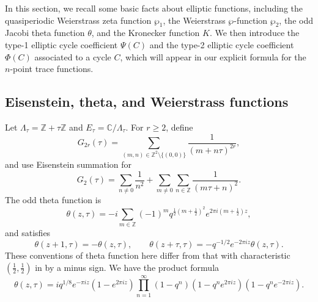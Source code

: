 \documentclass[11pt,a4paper]{amsart}
\numberwithin{equation}{section}
\theoremstyle{definition}
\theoremstyle{remark}
\newcommand{\CC}{\mathbb C}
\newcommand{\ZZ}{\mathbb Z}
\newcommand{\ii}{i}
\newcommand{\e}{e}
\begin{document}
In this section, we recall some basic facts about elliptic functions, including the quasiperiodic Weierstrass zeta function $\wp_1$, the Weierstrass $\wp$-function $\wp_2$, the odd Jacobi theta function $\theta$, and the Kronecker function $K$. We then introduce the type-1 elliptic cycle coefficient $\Psi(C)$ and the type-2 elliptic cycle coefficient $\Phi(C)$ associated to a cycle $C$, which will appear in our explicit formula for the $n$-point trace functions.



\subsection{Eisenstein, theta, and Weierstrass functions}

Let $\Lambda_\tau=\ZZ+\tau\ZZ$ and
$E_\tau=\CC/\Lambda_\tau$.  For $r\geq2$, define
\begin{equation*}
 G_{2r}(\tau)=
 \sum_{(m,n)\in\ZZ^2\setminus\{(0,0)\}}
 \frac{1}{(m+n\tau)^{2r}},
\end{equation*}
and use Eisenstein summation for
\begin{equation*}
 G_2(\tau)=\sum_{n\neq0}\frac1{n^2}
 +\sum_{m\neq0}\sum_{n\in\ZZ}\frac1{(m\tau+n)^2}.
\end{equation*}
The odd theta function is
\begin{equation}
 \theta(z,\tau)=-\ii\sum_{m\in\ZZ}(-1)^m
 q^{\frac12(m+\frac12)^2}\e^{2\pi\ii(m+\frac12)z},
 \label{eq:odd-theta}  
\end{equation}
and satisfies
\begin{equation*}
 \theta(z+1,\tau)=-\theta(z,\tau),\qquad
 \theta(z+\tau,\tau)=-q^{-1/2}\e^{-2\pi\ii z}\theta(z,\tau).
\end{equation*}
These conventions of theta function here differ from that with characteristic $(\frac12,\frac12)$ in \cite[Chapter~I]{Mumford} by a minus sign.
We have the product formula
\begin{equation}
\theta(z,\tau)
= i q^{1/8} e^{-\pi i z}
(1-e^{2\pi i z})
\prod_{n=1}^{\infty}
(1-q^n)
(1-q^n e^{2\pi i z})
(1-q^n e^{-2\pi i z}).
\end{equation}
\end{document}
